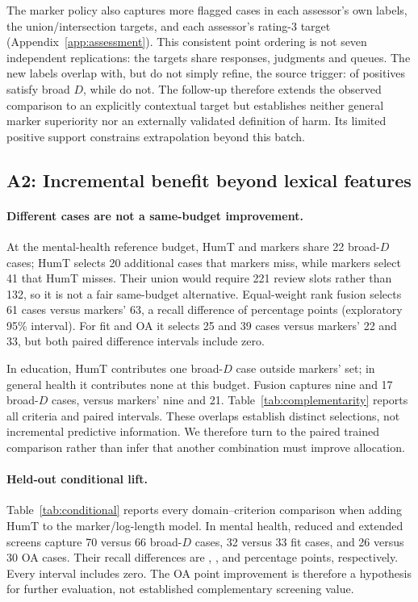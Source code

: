 \documentclass[manuscript,screen,review,anonymous]{acmart}
\begin{document}
The marker policy also captures more flagged cases in each assessor's own labels, the union/intersection targets, and each assessor's rating-3 target (Appendix~\ref{app:assessment}). This consistent point ordering is not seven independent replications: the targets share responses, judgments and queues. The new labels overlap with, but do not simply refine, the source trigger: \IAInsideD{} of \IAPositive{} positives satisfy broad $D$, while \IAOutsideD{} do not. The follow-up therefore extends the observed comparison to an explicitly contextual target but establishes neither general marker superiority nor an externally validated definition of harm. Its limited positive support constrains extrapolation beyond this batch.

\subsection{A2: Incremental benefit beyond lexical features}
\paragraph{Different cases are not a same-budget improvement.}
At the mental-health reference budget, HumT and markers share 22 broad-$D$ cases; HumT selects 20 additional cases that markers miss, while markers select 41 that HumT misses. Their union would require 221 review slots rather than 132, so it is not a fair same-budget alternative. Equal-weight rank fusion selects 61 cases versus markers' 63, a recall difference of \MHFusionDelta{} percentage points (exploratory 95\% interval). For fit and OA it selects 25 and 39 cases versus markers' 22 and 33, but both paired difference intervals include zero.

In education, HumT contributes one broad-$D$ case outside markers' set; in general health it contributes none at this budget. Fusion captures nine and 17 broad-$D$ cases, versus markers' nine and 21. Table~\ref{tab:complementarity} reports all criteria and paired intervals. These overlaps establish distinct selections, not incremental predictive information. We therefore turn to the paired trained comparison rather than infer that another combination must improve allocation.

\paragraph{Held-out conditional lift.}
Table~\ref{tab:conditional} reports every domain--criterion comparison when adding HumT to the marker/log-length model. In mental health, reduced and extended screens capture 70 versus 66 broad-$D$ cases, 32 versus 33 fit cases, and 26 versus 30 OA cases. Their recall differences are \MHDConditional{}, \MHFConditional{}, and \MHOAConditional{} percentage points, respectively. Every interval includes zero. The OA point improvement is therefore a hypothesis for further evaluation, not established complementary screening value.

\end{document}
